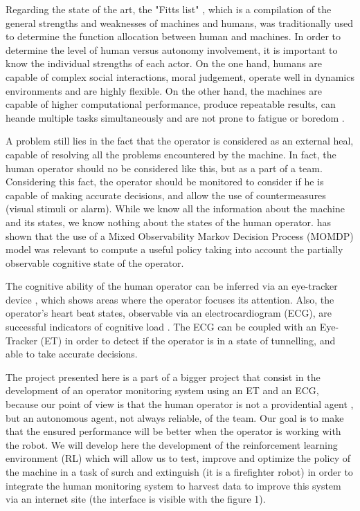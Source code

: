 \documentclass[conference]{IEEEtran}
\begin{document}
Regarding the state of the art, the "Fitts list" \cite{FITTS}
, which is a compilation of the general strengths and weaknesses of machines and humans, was traditionally used to determine the function allocation between human and machines. In order to determine the level of human versus autonomy involvement, it is important to know the individual strengths of each actor. On the one hand, humans are capable of complex social interactions, moral judgement, operate well in dynamics environments and are highly flexible. On the other hand, the machines are capable of higher computational performance, produce repeatable results, can heande multiple tasks simultaneously and are not prone to fatigue or boredom \cite{NOTHWANG}.

A problem still lies in the fact that the operator is considered as an external heal, capable of resolving all the problems encountered by the machine. In fact, the human operator should no be considered like this, but as a part of a team. Considering this fact, the operator should be monitored to consider if he is capable of making accurate decisions, and allow the use of countermeasures (visual stimuli or alarm). While we know all the information about the machine and its states, we know nothing about the states of the human operator. \cite{SOUZA}
 has shown that the use of a Mixed Observability Markov Decision Process (MOMDP) \cite{ONG} 
 model was relevant to compute a useful policy taking into account the partially observable cognitive state of the operator.

The cognitive ability of the human operator can be inferred via an eye-tracker device \cite{GATEAU}
, which shows areas where the operator focuses its attention. Also, the operator's heart beat states, observable via an electrocardiogram (ECG), are successful indicators of cognitive load \cite{WILSON}
. The ECG can be coupled with an Eye-Tracker (ET) in order to detect if the operator is in a state of tunnelling, and able to take accurate decisions.

The project presented here is a part of a bigger project that consist in the development of an operator monitoring system using an ET and an ECG, because our point of view is that the human operator is not a providential agent \cite{SOUZA}
, but an autonomous agent, not always reliable, of the team. Our goal is to make that the ensured performance will be better when the operator is working with the robot. We will develop here the development of the reinforcement learning environment (RL) which will allow us to test, improve and optimize the policy of the machine in a task of surch and extinguish (it is a firefighter robot) in order to integrate the human monitoring system to harvest data to improve this system via an internet site (the interface is visible with the figure 1).
\end{document}
